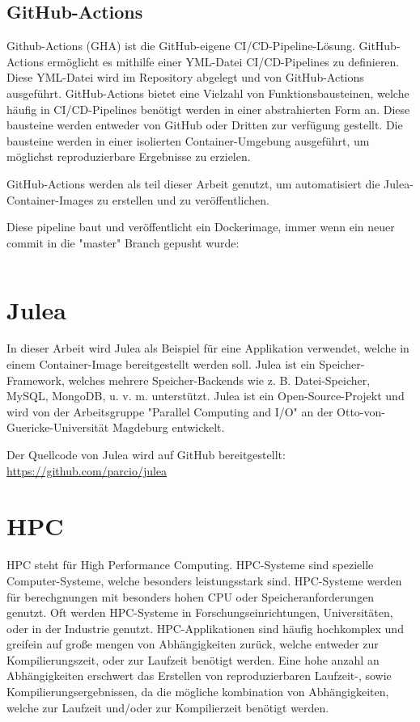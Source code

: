 \subsection{GitHub-Actions}

Github-Actions (GHA) ist die GitHub-eigene CI/CD-Pipeline-Lösung. GitHub-Actions ermöglicht es mithilfe einer YML-Datei CI/CD-Pipelines zu definieren. Diese YML-Datei wird im Repository abgelegt und von GitHub-Actions ausgeführt. GitHub-Actions bietet eine Vielzahl von Funktionsbausteinen, welche häufig in CI/CD-Pipelines benötigt werden in einer abstrahierten Form an. Diese bausteine werden entweder von GitHub oder Dritten zur verfügung gestellt. Die bausteine werden in einer isolierten Container-Umgebung ausgeführt, um möglichst reproduzierbare Ergebnisse zu erzielen.

GitHub-Actions werden als teil dieser Arbeit genutzt, um automatisiert die Julea-Container-Images zu erstellen und zu veröffentlichen.

Diese pipeline baut und veröffentlicht ein Dockerimage, immer wenn ein neuer commit in die "master" Branch gepusht wurde:
\inputminted{yaml}{./code-examples/gha.yml} 

\section{Julea}

In dieser Arbeit wird Julea als Beispiel für eine Applikation verwendet, welche in einem Container-Image bereitgestellt werden soll. Julea ist ein Speicher-Framework, welches mehrere Speicher-Backends wie z. B. Datei-Speicher, MySQL, MongoDB, u. v. m. unterstützt. Julea ist ein Open-Source-Projekt und wird von der Arbeitsgruppe "Parallel Computing and I/O" an der Otto-von-Guericke-Universität Magdeburg entwickelt.

Der Quellcode von Julea wird auf GitHub bereitgestellt: \url{https://github.com/parcio/julea}

\section{HPC}

HPC steht für High Performance Computing. HPC-Systeme sind spezielle Computer-Systeme, welche besonders leistungsstark sind. HPC-Systeme werden für berechgnungen mit besonders hohen CPU oder Speicheranforderungen genutzt. Oft werden HPC-Systeme in Forschungseinrichtungen, Universitäten, oder in der Industrie genutzt. HPC-Applikationen sind häufig hochkomplex und greifein auf große mengen von Abhängigkeiten zurück, welche entweder zur Kompilierungszeit, oder zur Laufzeit benötigt werden. Eine hohe anzahl an Abhängigkeiten erschwert das Erstellen von reproduzierbaren Laufzeit-, sowie Kompilierungsergebnissen, da die mögliche kombination von Abhängigkeiten, welche zur Laufzeit und/oder zur Kompilierzeit benötigt werden. 

